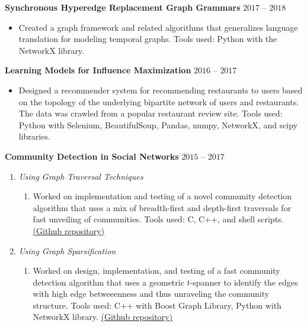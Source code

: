 \documentclass[11pt]{article}
\newenvironment{innerlist}[1][\enskip]%
        {\begin{enumerate}[#1,leftmargin=*,parsep=0pt,itemsep=0pt,topsep=0pt,partopsep=0pt]}
        {\end{enumerate}}
\newenvironment{loneinnerlist}[1][\enskip\textbullet]%
        {\begin{itemize}[#1,leftmargin=*,parsep=0pt,itemsep=0pt,topsep=0pt,partopsep=0pt]}
        {\end{itemize}\vspace{-.6\baselineskip}}
\newcommand{\blankline}{\quad\pagebreak[3]}
\newcommand{\halfblankline}{\quad\vspace{-0.5\baselineskip}\pagebreak[3]}
\begin{document}
\halfblankline

\textbf{Synchronous Hyperedge Replacement Graph Grammars} \hfill $2017$ -- $2018$
\begin{loneinnerlist}
    \item[] Created a graph framework and related algorithms that generalizes language translation for modeling temporal graphs. Tools used: Python with the NetworkX library.
\end{loneinnerlist}

\blankline

\textbf{Learning Models for Influence Maximization} \hfill $2016$ -- $2017$

\begin{loneinnerlist}
    \item[] Designed a recommender system for recommending restaurants to users based on the topology of the underlying bipartite network of users and restaurants. The data was crawled from a popular restaurant review site. Tools used: Python with Selenium, BeautifulSoup, Pandas, numpy, NetworkX, and scipy libraries. 
\end{loneinnerlist}

\vspace*{0.5cm}    
\textbf{Community Detection in Social Networks} \hfill $2015$ -- $2017$
    \begin{innerlist}
        \item[] \textit{Using Graph Traversal Techniques}
        \begin{innerlist}
            \item[] Worked on implementation and testing of a novel community detection algorithm that uses a mix of breadth-first and depth-first traversals for fast unveiling of communities. Tools used: C, C++, and shell scripts.  \href{https://github.com/sna-lincom/LINCOM}{(Github repository)}
        \end{innerlist}   
        \vspace{0.2cm}
        \item[] \textit{Using Graph Sparsification} 
        \begin{innerlist}
            \item[] Worked on design, implementation, and testing of a fast community detection algorithm that uses a geometric $t$-spanner to identify the edges with high edge betweeenness and thus unraveling the community structure. Tools used: C++ with Boost Graph Library, Python with NetworkX library. \href{https://github.com/satyakisikdar/spanner-comm-detection}{(Github repository)}
        \end{innerlist}
    \end{innerlist}
\end{document}
